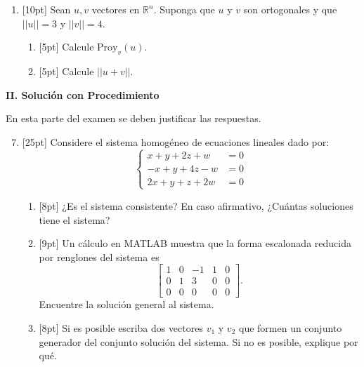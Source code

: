 \documentclass[11pt]{article}
\begin{document}
\begin{enumerate}
\item{}[10pt] Sean $u, v$ vectores en $\mathbb{R}^n$. Suponga que $u$ y $v$ son ortogonales y que $||u||=3$ y $||v||=4$.
\begin{enumerate}
\item{}[5pt] Calcule $\mathrm{Proy}_v(u)$.

\vspace{4pt}

\item{}[5pt] Calcule $||u+v||$.

\vspace{4pt}
\end{enumerate}
\end{enumerate}

\newpage
\noindent\textbf{\large II. Solución con Procedimiento}

\vspace{4pt}
\noindent En esta parte del examen se deben justificar las respuestas.

\begin{enumerate}
\setcounter{enumi}{6}
\item{}[25pt] Considere el sistema homogéneo de ecuaciones lineales dado por:
\[
\left\{
\begin{aligned}
x + y + 2z + w &= 0\\
-x + y + 4z - w &= 0\\
2x + y + z + 2w &= 0
\end{aligned}
\right.
\]
\begin{enumerate}
\item{}[8pt] ¿Es el sistema consistente? En caso afirmativo, ¿Cuántas soluciones tiene el sistema?

\vspace{3.5cm}

\item{}[9pt] Un cálculo en MATLAB muestra que la forma escalonada reducida por renglones del sistema es
\[
\left[\begin{array}{cccc|c}1 & 0 & -1 & 1 & 0\\ 0 & 1 & 3 & 0 & 0\\ 0 & 0 & 0 & 0 & 0\end{array}\right].
\]
Encuentre la solución general al sistema.

\vspace{4cm}

\item{}[8pt] Si es posible escriba dos vectores $v_1$ y $v_2$ que formen un conjunto generador del conjunto solución del sistema. Si no es posible, explique por qué.

\vspace{4cm}
\end{enumerate}
\end{enumerate}

\examfooter
\end{document}
